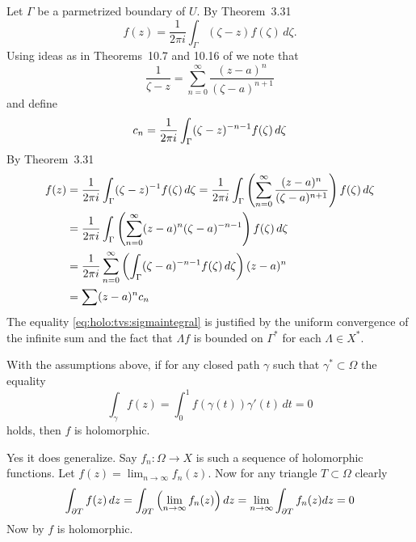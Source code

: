 \begin{enumerate}
\begin{itemize}
Let \(\Gamma\) be a parmetrized boundary of $U$.
By Theorem~3.31
\begin{equation*}
f(z) = \frac{1}{2\pi i}\int_\Gamma (\zeta -z)f(\zeta)\,d\zeta.
\end{equation*}
Using ideas as in Theorems~10.7 and 10.16 of \cite{RudinRCA80}
we note that
\begin{equation*}
\frac{1}{\zeta - z} = \sum_{n=0}^\infty \frac{(z-a)^n}{(\zeta - a)^{n+1}}
\end{equation*}
and define
\begin{equation*}
c_n = \frac{1}{2\pi i} \int_\Gamma (\zeta - z)^{-n-1}f(\zeta)\,d\zeta
\end{equation*}
By Theorem~3.31
\begin{align}
f(z) 
&= \frac{1}{2\pi i}\int_\Gamma (\zeta -z)^{-1} f(\zeta)\,d\zeta
 = \frac{1}{2\pi i}\int_\Gamma 
   \left(\sum_{n=0}^\infty \frac{(z-a)^n}{(\zeta - a)^{n+1}}\right) 
   f(\zeta)\,d\zeta \notag \\
&= \frac{1}{2\pi i}\int_\Gamma 
   \left(\sum_{n=0}^\infty (z-a)^n(\zeta - a)^{-n-1}\right) f(\zeta)\,d\zeta
   \notag\\
&= \label{eq:holo:tvs:sigmaintegral}
   \frac{1}{2\pi i}
   \sum_{n=0}^\infty
     \left(\int_\Gamma (\zeta - a)^{-n-1} f(\zeta)\,d\zeta \right)
     (z-a)^n \notag \\
&= \sum(z-a)^n c_n
\end{align}
The equality \eqref{eq:holo:tvs:sigmaintegral} is justified
by the uniform convergence of the infinite sum
and the fact that \(\Lambda f\) is bounded on \(\Gamma^*\)
for each \(\Lambda \in X^*\).

With the assumptions above,
if for any closed path \(\gamma\) such that \(\gamma^* \subset \Omega\)
the equality
\begin{equation*}
\int_\gamma f(z) = \int_0^1 f(\gamma(t))\gamma'(t)\,dt = 0
\end{equation*}
holds, then $f$ is holomorphic.

Yes it does generalize.
Say \(f_n:\Omega \to X\) is such a sequence of holomorphic functions.
Let \(f(z) = \lim_{n\to\infty} f_n(z)\).
Now for any triangle \(T \subset \Omega\) clearly 
\begin{equation*}
\int_{\partial T} f(z)\,dz
= \int_{\partial T} \left(\lim_{n\to\infty} f_n(z)\right) dz 
= \lim_{n\to\infty} \int_{\partial T} f_n(z) dz 
= 0
\end{equation*}
Now by  $f$ is holomorphic.
\end{itemize}



\end{enumerate}
